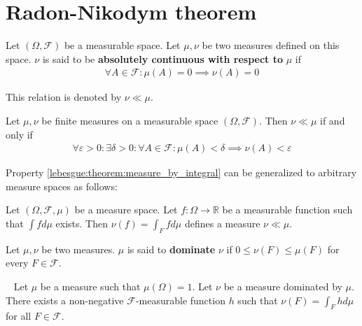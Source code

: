 \section{Radon-Nikodym theorem}\label{lebesgue:section:Radon-Nikodym}
	
	\begin{definition}\label{lebesgue:absolute_continuity}
		Let $(\Omega,\mathcal{F})$ be a measurable space. Let $\mu, \nu$ be two measures defined on this space. $\nu$ is said to be \textbf{absolutely continuous with respect to} $\mu$ if
        	\begin{gather}
	        	\forall A\in\mathcal{F}: \mu(A) = 0\implies\nu(A) = 0
		\end{gather}
	\end{definition}
	\begin{notation}
		This relation is denoted by $\nu \ll \mu$.
	\end{notation}
	\begin{theorem}
    		Let $\mu, \nu$ be finite measures on a measurable space $(\Omega, \mathcal{F})$. Then $\nu\ll\mu$ if and only if
	        \begin{gather}
        		\forall\varepsilon>0:\exists\delta>0:\forall A\in\mathcal{F}:\mu(A)<\delta\implies\nu(A)<\varepsilon
	        \end{gather}
	\end{theorem}

	Property \ref{lebesgue:theorem:measure_by_integral} can be generalized to arbitrary measure spaces as follows:
	\begin{property}
		Let $(\Omega,\mathcal{F}, \mu)$ be a measure space. Let $f:\Omega\rightarrow\mathbb{R}$ be a measurable function such that $\int fd\mu$ exists. Then $\nu(f) = \int_Ffd\mu$ defines a measure $\nu\ll\mu$.
	\end{property}

	\begin{definition}
    		Let $\mu, \nu$ be two measures. $\mu$ is said to \textbf{dominate} $\nu$ if $0\leq\nu(F)\leq\mu(F)$ for every $F\in\mathcal{F}$.
	\end{definition}
    
	\begin{theorem}~\newline
		Let $\mu$ be a measure such that $\mu(\Omega) = 1$. Let $\nu$ be a measure dominated by $\mu$. There exists a non-negative $\mathcal{F}$-measurable function $h$ such that $\nu(F) = \int_F hd\mu$ for all $F\in\mathcal{F}$.
	\end{theorem}

